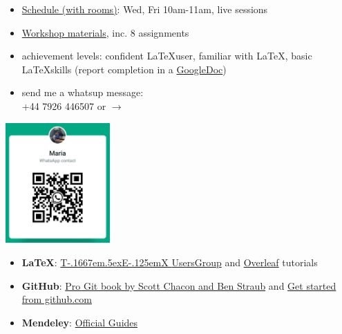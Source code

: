 \documentclass[a4paper,12pt]{article} %
\def\TeX{{\rm T\kern-.1667em\lower.5ex\hbox{E}\kern-.125emX }}
\newcommand{\llogo}{\LaTeX }
\begin{document}
\begin{center}

\begin{tcolorbox}[width=\textwidth, colback={yellow!40!white}, title={\textbf{Housekeeping}}, colbacktitle=yellow!60!white, coltitle=black]
	
	\begin{multicols}{2}

		\begin{itemize}
			\item \href{https://wlv.instructure.com/courses/33429/pages/latex-and-mendeley-workshop}{Schedule (with rooms)}: Wed, Fri 10am-11am, live sessions
			\item \href{https://github.com/kunilovskaya/dskills_workshop}{Workshop materials}, inc. 8 assignments 
			\item achievement levels: confident \llogo user, familiar with \LaTeX, basic \llogo skills (report completion in a \href{}{GoogleDoc})
			\item send me a whatsup message: \\ +44 7926 446507 or $\rightarrow$
		\end{itemize}
	
	\columnbreak
	\centering
	 \includegraphics[width=40mm]{maria_ku_whatsup_contact}%


\end{multicols}
\end{tcolorbox}%

\bigskip%

\begin{tcolorbox}[width=\textwidth, colback={white}, title={\textbf{Recommended resources}}, colbacktitle=white, coltitle=black]
	\begin{itemize}
	\item \textbf{LaTeX}: \href{https://tug.org/begin.html}{\TeX UsersGroup} and \href{https://www.overleaf.com/learn/latex/Learn_LaTeX_in_30_minutes}{Overleaf} tutorials
	\item \textbf{GitHub}: \href{https://git-scm.com/book/en/v2}{Pro Git book by Scott Chacon and Ben Straub} and \href{https://docs.github.com/en/get-started}{Get started from github.com}
	\item \textbf{Mendeley}: \href{https://www.mendeley.com/guides}{Official Guides}
	
\end{itemize}
	
\end{tcolorbox}%

\end{center}
\end{document}
